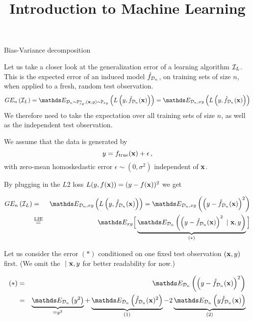 \documentclass[11pt,compress,t,notes=noshow, xcolor=table]{beamer}
\title{Introduction to Machine Learning}
\date{}
\begin{document}




\begin{vbframe} {Bias-Variance decomposition}

Let us take a closer look at the generalization error of a learning algorithm $\mathcal{I}_{L}$.
This is the expected error of an induced model $\hat{f}_{\mathcal{D}_n}$, on training sets of size $n$, when applied to a fresh, random test observation.
  $$GE_n\left(\ind_{L}\right) = \E_{\D_n \sim \Pxy^n, (\xv, y) \sim \Pxy}\left( L\left(y, \fh_{\D_n}(\xv)\right) \right) = \E_{\D_n, xy}\left( L\left(y, \fh_{\D_n}(\xv)\right) \right)  $$
We therefore need to take the expectation over all training sets of size $n$, as well as the independent test observation.

\lz 

We assume that the data is generated by 
$$
y = f_{\text{true}}(\mathbf{x}) + \epsilon\,,
$$
with zero-mean homoskedastic error $\epsilon \sim (0, \sigma^2)$ independent of $\mathbf{x}$.  

\framebreak 

By plugging in the $L2$ loss $L(y, f(\mathbf{x})) = (y - f(\mathbf{x}))^2$ we get

\begin{footnotesize}
\begin{eqnarray*}
GE_n\left(\ind_{L}\right) &=& \E_{\D_n, xy}\left( L\left(y, \fh_{\D_n}(\xv)\right)\right) = \E_{\D_n, xy}\left(\left(y - \fh_{\D_n}(\xv)\right)^2\right) \\
&\stackrel{\text{LIE}}{=}& \E_{xy}\Big[\underbrace{\E_{\D_n}\left(\left(y - \fh_{\D_n}(\xv)\right)^2~|~ \xv, y\right)}_{(*)}\Big] 
\end{eqnarray*}
\end{footnotesize}

Let us consider the error $(*)$ conditioned on one fixed test observation $(\mathbf{x}, y)$ first. (We omit the $~|~\mathbf{x}, y$ for better readability for now.)

\begin{footnotesize}
\begin{eqnarray*}
(*) &=& \E_{\D_n}\left(\left(y - \fh_{\D_n}(\xv)\right)^2\right)\\
&=& \underbrace{\E_{\D_n}\left(y^2\right)}_{= y^2} + \underbrace{\E_{\D_n}\left(\fh_{\D_n}(\xv)^2\right)}_{(1)}  - 2\underbrace{\E_{\D_n}\left(y\fh_{\D_n}(\xv)\right)}_{(2)} 
\end{eqnarray*}
\end{footnotesize}


\end{vbframe}
\end{document}
